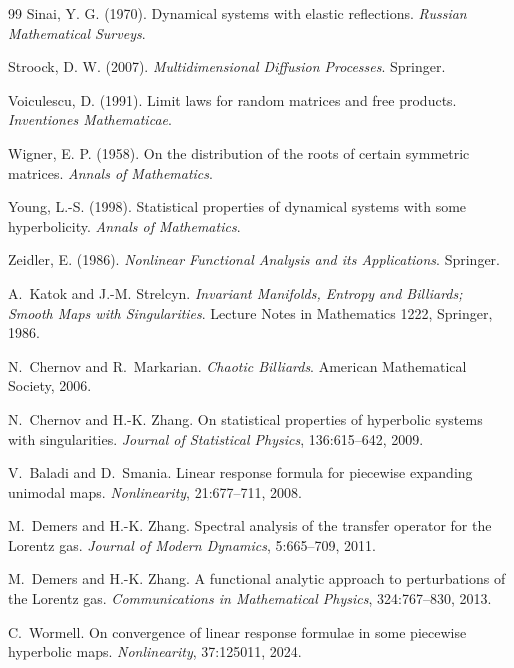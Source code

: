 \documentclass[12pt, letterpaper]{amsart}
\theoremstyle{plain}
\theoremstyle{definition}
\theoremstyle{remark}
\begin{document}
\begin{thebibliography}{99}
Sinai, Y. G. (1970).
\newblock Dynamical systems with elastic reflections.
\newblock \emph{Russian Mathematical Surveys}.

Stroock, D. W. (2007).
\newblock \emph{Multidimensional Diffusion Processes}.
\newblock Springer.

Voiculescu, D. (1991).
\newblock Limit laws for random matrices and free products.
\newblock \emph{Inventiones Mathematicae}.

Wigner, E. P. (1958).
\newblock On the distribution of the roots of certain symmetric matrices.
\newblock \emph{Annals of Mathematics}.

Young, L.-S. (1998).
\newblock Statistical properties of dynamical systems with some hyperbolicity.
\newblock \emph{Annals of Mathematics}.

Zeidler, E. (1986).
\newblock \emph{Nonlinear Functional Analysis and its Applications}.
\newblock Springer.


A.~Katok and J.-M. Strelcyn.
\newblock \emph{Invariant Manifolds, Entropy and Billiards; Smooth Maps with Singularities}.
\newblock Lecture Notes in Mathematics 1222, Springer, 1986.

N.~Chernov and R.~Markarian.
\newblock \emph{Chaotic Billiards}.
\newblock American Mathematical Society, 2006.

N.~Chernov and H.-K. Zhang.
\newblock On statistical properties of hyperbolic systems with singularities.
\newblock \emph{Journal of Statistical Physics}, 136:615--642, 2009.

V.~Baladi and D.~Smania.
\newblock Linear response formula for piecewise expanding unimodal maps.
\newblock \emph{Nonlinearity}, 21:677--711, 2008.

M.~Demers and H.-K. Zhang.
\newblock Spectral analysis of the transfer operator for the Lorentz gas.
\newblock \emph{Journal of Modern Dynamics}, 5:665--709, 2011.

M.~Demers and H.-K. Zhang.
\newblock A functional analytic approach to perturbations of the Lorentz gas.
\newblock \emph{Communications in Mathematical Physics}, 324:767--830, 2013.

C.~Wormell.
\newblock On convergence of linear response formulae in some piecewise hyperbolic maps.
\newblock \emph{Nonlinearity}, 37:125011, 2024.

\end{thebibliography}
\end{document}
